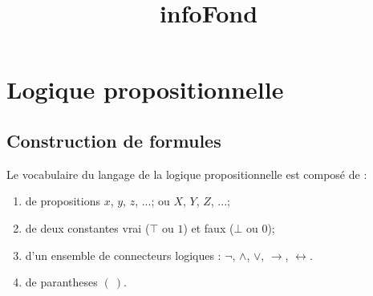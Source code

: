 \documentclass{rapportULB}
\title{infoFond} %
\begin{document}




        
\fairemarges %
\fairepagedegarde %


\section{Logique propositionnelle}
\subsection{Construction de formules}
Le vocabulaire du langage de la logique propositionnelle est composé de :
\begin{enumerate}
  \item de propositions $x$, $y$, $z$, ...; ou $X$, $Y$, $Z$, ...;
  \item de deux constantes vrai ($\top$ ou $1$) et faux ($\bot$ ou $0$);
  \item d'un ensemble de connecteurs logiques : $\neg$, $\wedge$, $\vee$, $\rightarrow$, $\leftrightarrow$.
  \item de parantheses $(\ )$.
\end{enumerate}
\end{document}
